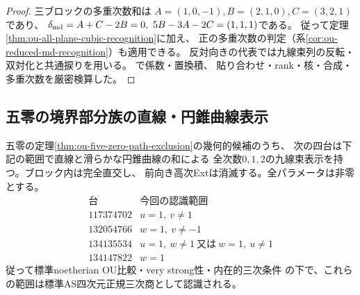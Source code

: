 \begin{proof}
三ブロックの多重次数和は
$A=(1,0,-1),B=(2,1,0),C=(3,2,1)$であり、
$\delta_{\rm md}=A+C-2B=0,\ 5B-3A-2C=(1,1,1)$である。
従って定理\ref{thm:ou-all-plane-cubic-recognition}に加え、
正の多重次数の判定（系\ref{cor:ou-reduced-md-recognition}）も適用できる。
反対向きの代表では九線束列の反転・双対化と共通捩りを用いる。
で係数・置換積、
貼り合わせ・rank・核・合成・多重次数を厳密検算した。
\end{proof}

\subsection{五零の境界部分族の直線・円錐曲線表示}
\label{subsec:ou-five-zero-expanded}

\begin{theorem}[五零の三つの一係数残余への帰着]
\label{thm:ou-five-zero-expanded-curves}
五零の定理\ref{thm:ou-five-zero-path-exclusion}の幾何的候補のうち、
次の四台は下記の範囲で直線と滑らかな円錐曲線の和による
全次数$0,1,2$の九線束表示を持つ。ブロック内は完全直交し、
前向き高次Extは消滅する。全パラメータは非零とする。
\[
\begin{array}{r|l}
\text{台}&\text{今回の認識範囲}\\ \hline
117374702&u=1,\ v\ne1\\
132054766&w=1,\ v\ne-1\\
134135534&u=1,\ w\ne1\ \text{又は}\ w=1,\ u\ne1\\
134147822&w=1
\end{array}
\]
従って標準noetherian OU比較・very strong性・内在的三次条件
の下で、これらの範囲は標準AS四次元正規三次商として認識される。
\end{theorem}

